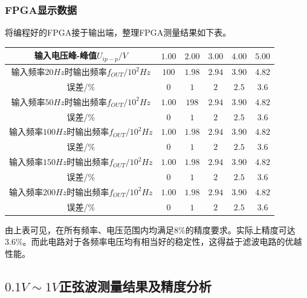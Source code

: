 \documentclass[12pt,a4paper]{article}
\begin{document}
\begin{spacing}{1.3}
\subsubsection{FPGA显示数据}
将编程好的FPGA接于输出端，整理FPGA测量结果如下表。
\begin{table}[H]
\centering
\begin{tabular}{|c|c|c|c|c|c|}
\hline 
输入电压峰-峰值$U_{ip-p}/V$&$1.00$&$2.00$&$3.00$&$4.00$&$5.00$\\ \hline 
输入频率$20Hz时输出频率f_{OUT}/10^2Hz$&$100$ &$1.98$ &$2.94$ &$3.90$ &$4.82$ \\ \hline
误差/\%&$0$&$1$&$2$&$2.5$&$3.6$\\ \hline
输入频率$50Hz时输出频率f_{OUT}/10^2Hz$&$1.00$ &$198$ &$2.94$ &$3.90$ &$4.82$ \\ \hline
误差/\%&$0$&$1$&$2$&$2.5$&$3.6$\\ \hline
输入频率$100Hz时输出频率f_{OUT}/10^2Hz$&$1.00$ &$1.98$ &$2.94$ &$3.90$ &$4.82$ \\ \hline
误差/\%&$0$&$1$&$2$&$2.5$&$3.6$\\ \hline
输入频率$150Hz时输出频率f_{OUT}/10^2Hz$&$1.00$ &$1.98$ &$2.94$ &$3.90$ &$4.82$ \\ \hline
误差/\%&$0$&$1$&$2$&$2.5$&$3.6$\\ \hline
输入频率$200Hz时输出频率f_{OUT}/10^2Hz$&$1.00$ &$1.98$ &$2.94$ &$3.90$ &$4.82$ \\ \hline
误差/\%&$0$&$1$&$2$&$2.5$&$3.6$\\ \hline
\end{tabular} 
\end{table}
由上表可见，在所有频率、电压范围内均满足$8\%$的精度要求。实际上精度可达$3.6\%$。而此电路对于各频率电压均有相当好的稳定性，这得益于滤波电路的优越性能。
\subsection{$0.1V\sim 1V$正弦波测量结果及精度分析}

\end{spacing}
\end{document}
